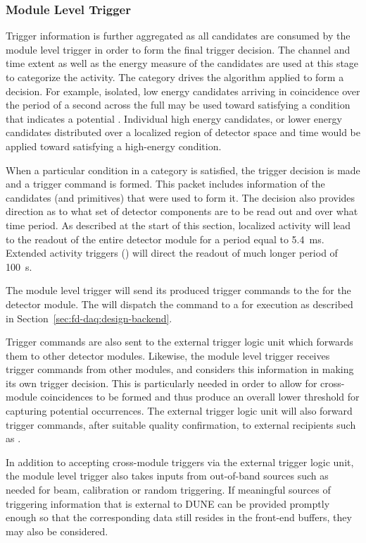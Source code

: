 \subsubsection{Module Level Trigger}

Trigger information is further aggregated as all candidates are consumed
by the module level trigger in order to form the final trigger decision. 
The channel and time extent as well as the energy measure of the
candidates are used at this stage to categorize the activity. 
The category drives the algorithm applied to form a decision.
For example, isolated, low energy candidates arriving in coincidence
over the period of a second across the full  may be used toward
satisfying a condition that indicates a potential . 
Individual high energy candidates, or lower energy candidates
distributed over a localized region of detector space and time would be
applied toward satisfying a high-energy condition. 

When a particular condition in a category is satisfied, the trigger
decision is made and a trigger command is formed. 
This packet includes information of the candidates (and primitives)
that were used to form it. 
The decision also provides direction as to what set of detector components
are to be read out and over what time period.
As described at the start of this section, localized activity will lead
to the readout of the entire detector module for a period equal to \SI{5.4}{ms}.  Extended activity triggers () will
direct the readout of much longer period of \SI{100}{s}.

The module level trigger will send its produced trigger commands to the
 for the detector module.  The
 will dispatch the command to a  for
execution as described in Section~\ref{sec:fd-daq:design-backend}.

Trigger commands are also sent to the external trigger logic unit which
forwards them to other detector modules. Likewise, the module level
trigger receives trigger commands from other modules, and considers
this information in making its own trigger decision.
This is particularly needed in order to allow for cross-module
coincidences to be formed and thus produce an overall lower threshold for
capturing potential  occurrences. 
The external trigger logic unit will also forward  trigger
commands, after suitable quality confirmation, to external recipients
such as .

In addition to accepting cross-module triggers via the external trigger
logic unit, the module level trigger also takes inputs from out-of-band sources such as
needed for beam, calibration or random triggering. 
If meaningful sources of triggering information that is external to
DUNE can be provided promptly enough so that the corresponding data
still resides in the front-end buffers, they may also be considered.


